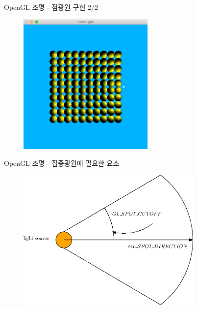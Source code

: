 \documentclass{beamer}
\begin{document}
\begin{frame}[fragile]{OpenGL 조명 - 점광원 구현 2/2}


\begin{figure}[h!]
  \centering
    \includegraphics[height=7cm]{OGL_light/pointLight.png}
\end{figure}

\end{frame}

\begin{frame}[fragile]{OpenGL 조명 - 집중광원에 필요한 요소}


\begin{figure}[h!]
  \centering
    \includegraphics[height=7cm]{OGL_light/spotLight.eps}
\end{figure}

\end{frame}
\end{document}
